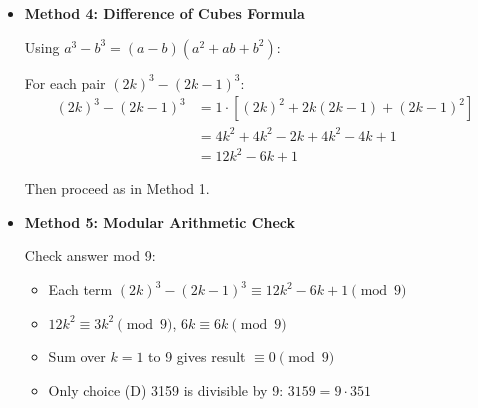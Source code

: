\documentclass[12pt]{article}
\begin{document}
\begin{techniquesbox}
\begin{itemize}[leftmargin=*]
    \begin{align*}
    &= 2 \cdot 8 \cdot (1^3 + \cdots + 9^3) - (1^3 + \cdots + 18^3)\\
    &= 16(45)^2 - (171)^2\\
    &= 16 \cdot 2025 - 29241\\
    &= 32400 - 29241\\
    &= 3159
    \end{align*}
    
    Or more elegantly:
    \begin{align*}
    16(45)^2 - (171)^2 &= (9 \cdot 20)^2 - (9 \cdot 19)^2\\
    &= 81(400 - 361)\\
    &= 81 \cdot 39\\
    &= 3159
    \end{align*}
    
    \item \textbf{Method 4: Difference of Cubes Formula}
    
    Using $a^3 - b^3 = (a-b)(a^2+ab+b^2)$:
    
    For each pair $(2k)^3 - (2k-1)^3$:
    \begin{align*}
    (2k)^3 - (2k-1)^3 &= 1 \cdot [(2k)^2 + 2k(2k-1) + (2k-1)^2]\\
    &= 4k^2 + 4k^2 - 2k + 4k^2 - 4k + 1\\
    &= 12k^2 - 6k + 1
    \end{align*}
    
    Then proceed as in Method 1.
    
    \item \textbf{Method 5: Modular Arithmetic Check}
    
    Check answer mod 9:
    \begin{itemize}
        \item Each term $(2k)^3 - (2k-1)^3 \equiv 12k^2 - 6k + 1 \pmod{9}$
        \item $12k^2 \equiv 3k^2 \pmod{9}$, $6k \equiv 6k \pmod{9}$
        \item Sum over $k=1$ to 9 gives result $\equiv 0 \pmod{9}$
        \item Only choice (D) 3159 is divisible by 9: $3159 = 9 \cdot 351$
    \end{itemize}
\end{itemize}


\end{techniquesbox}
\end{document}

